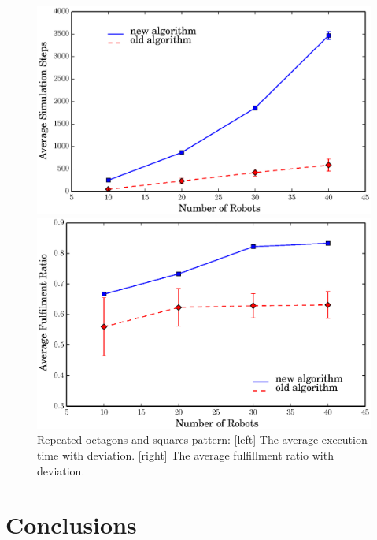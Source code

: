   \begin{figure}
  \centering 
    \begin{minipage}[b]{0.75\linewidth}
    \centering 
      \includegraphics[trim=0.5cm 0cm 1.5cm 0,clip=true,width=\linewidth]{figs/steps_octagon_square}
    \end{minipage}
    \begin{minipage}[b]{0.75\linewidth}
    \centering 
      \includegraphics[trim=0.5cm 0 1.5cm 0,clip=true,width=\linewidth]{figs/ratio_octagon_square}
    \end{minipage}
    \caption{Repeated octagons and squares pattern: [left] The average execution time with deviation. [right] The average fulfillment ratio with deviation.}
    \label{fig:octsq_comp}
  \end{figure}
  
\section{Conclusions}
\label{sec:conc-mrf2}

